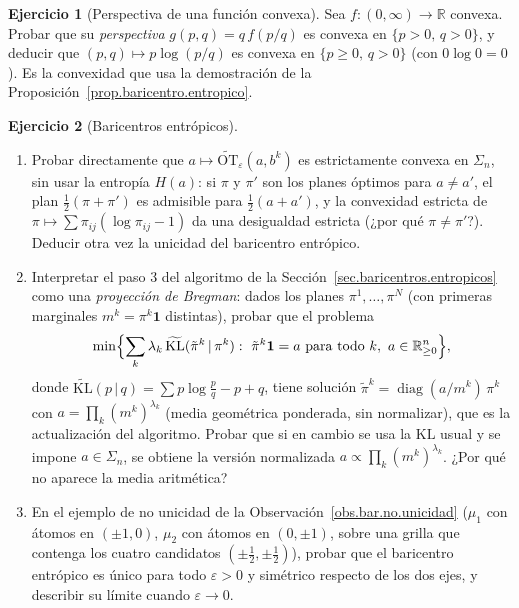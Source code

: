 \documentclass[12pt, a4paper]{amsbook}
\newcommand{\ve}{\varepsilon}
\newcommand{\R}{{\mathbb R}}
\theoremstyle{remark}
\theoremstyle{definition}
\newtheorem{ejercicio}{Ejercicio}[chapter]
\numberwithin{section}{chapter}
\numberwithin{subsection}{section}
\numberwithin{equation}{section}
\numberwithin{figure}{chapter}
\begin{document}
\begin{ejercicio}[Perspectiva de una función convexa]\label{ejer.perspectiva}
Sea $f\colon(0,\infty)\to\R$ convexa. Probar que su \emph{perspectiva}
$g(p,q)=q\,f(p/q)$ es convexa en $\{p>0,\,q>0\}$, y deducir que
$(p,q)\mapsto p\log(p/q)$ es convexa en $\{p\ge0,\,q>0\}$ (con $0\log0=0$).
Es la convexidad que usa la demostración de la
Proposición~\ref{prop.baricentro.entropico}.
\end{ejercicio}

\begin{ejercicio}[Baricentros entrópicos]\label{ejer.bar.entropico}
\leavevmode
\begin{enumerate}[label=(\alph*)]
\item Probar directamente que $a\mapsto\widetilde{\mathrm{OT}}_\ve(a,b^k)$ es
estrictamente convexa en $\Sigma_n$, sin usar la entropía $H(a)$:
si $\pi$ y $\pi'$ son los planes óptimos para $a\ne a'$, el plan
$\frac12(\pi+\pi')$ es admisible para $\frac12(a+a')$, y la convexidad
estricta de $\pi\mapsto\sum\pi_{ij}(\log\pi_{ij}-1)$ da una desigualdad
estricta (¿por qué $\pi\ne\pi'$?). Deducir otra vez la unicidad del
baricentro entrópico.
\item Interpretar el paso 3 del algoritmo de la
Sección~\ref{sec.baricentros.entropicos} como una \emph{proyección de
Bregman}: dados los planes $\pi^1,\dots,\pi^N$ (con primeras marginales
$m^k=\pi^k\mathbf 1$ distintas), probar que el problema
\[
\min\Bigl\{\sum_k\lambda_k\,\widetilde{\mathrm{KL}}(\tilde\pi^k\,|\,\pi^k):\ \tilde\pi^k\mathbf 1=a\ \text{para todo }k,\ a\in\R^n_{\ge0}\Bigr\},
\]
donde $\widetilde{\mathrm{KL}}(p\,|\,q)=\sum p\log\frac pq-p+q$,
tiene solución $\tilde\pi^k=\operatorname{diag}(a/m^k)\,\pi^k$ con
$a=\prod_k(m^k)^{\lambda_k}$ (media geométrica ponderada, sin normalizar),
que es la actualización del algoritmo. Probar que si en cambio se usa la
$\mathrm{KL}$ usual y se impone $a\in\Sigma_n$, se obtiene la versión
normalizada $a\propto\prod_k(m^k)^{\lambda_k}$. ¿Por qué no aparece la media
aritmética?
\item En el ejemplo de no unicidad de la Observación~\ref{obs.bar.no.unicidad}
($\mu_1$ con átomos en $(\pm1,0)$, $\mu_2$ con átomos en $(0,\pm1)$, sobre
una grilla que contenga los cuatro candidatos $(\pm\frac12,\pm\frac12)$),
probar que el baricentro entrópico es único para todo $\ve>0$ y simétrico
respecto de los dos ejes, y describir su límite cuando $\ve\to0$.
\end{enumerate}
\end{ejercicio}
\end{document}
